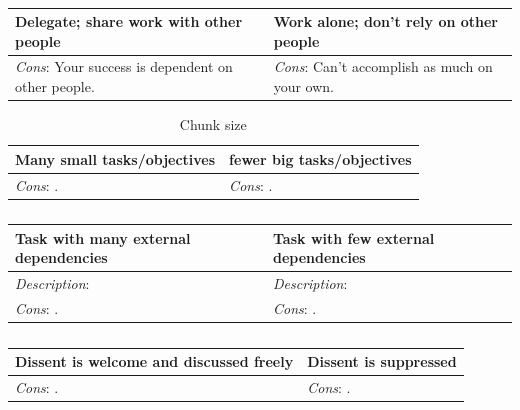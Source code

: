 \begin{center}
\begin{table}[ht]
\begin{tabular}{ | m{\dilemmatablewidth}| m{\dilemmatablewidth} | } 
  \hline
  \textbf{Delegate; share work with other people} & 
  \textbf{Work alone; don't rely on other people} \\ 
  \hline
  \textit{Cons}: Your success is dependent on other people. & 
  \textit{Cons}: Can't accomplish as much on your own. \\  
  \hline
\end{tabular}
\caption{
}
\label{table:delegate-or-not}
\end{table}
\end{center}

\begin{center}
\begin{table}[ht]
\begin{tabular}{ | m{\dilemmatablewidth}| m{\dilemmatablewidth} | } 
  \hline
  \textbf{Many small tasks/objectives} & 
  \textbf{fewer big tasks/objectives} \\ 
  \hline
  \textit{Cons}: . & 
  \textit{Cons}: . \\  
  \hline
\end{tabular}
\caption{Chunk size
}
\label{table:chunk_size}
\end{table}
\end{center}

\begin{center}
\begin{table}[ht]
\begin{tabular}{ | m{\dilemmatablewidth}| m{\dilemmatablewidth} | } 
  \hline
  \textbf{Task with many external dependencies} & 
  \textbf{Task with few external dependencies} \\ 
  \hline
  \textit{Description}:  & 
  \textit{Description}:  \\ 
  \hline
  \textit{Cons}: . & 
  \textit{Cons}: . \\  
  \hline
\end{tabular}
\caption{
}
\label{table:number_of_external dependencies}
\end{table}
\end{center}


\begin{center}
\begin{table}[ht]
\begin{tabular}{ | m{\dilemmatablewidth}| m{\dilemmatablewidth} | } 
  \hline
  \textbf{Dissent is welcome and discussed freely} & 
  \textbf{Dissent is suppressed} \\ 
  \hline
  \textit{Cons}: . & 
  \textit{Cons}: . \\  
  \hline
\end{tabular}
\caption{
}
\label{table:how_dissent_is_responded_to}
\end{table}
\end{center}


